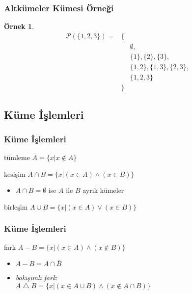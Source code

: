 \documentclass[dvipsnames]{beamer}
\theoremstyle{definition}
\theoremstyle{example}
\newtheorem{ornek}[theorem]{Örnek}
\theoremstyle{plain}
\begin{document}
\begin{frame}
  \frametitle{Altkümeler Kümesi Örneği}

  \begin{ornek}
    \begin{eqnarray*}
      \mathcal{P}(\{1,2,3\}) = & \{ &\\
                               &    & \emptyset,\\
                               &    & \{1\},\{2\},\{3\},\\
                               &    & \{1,2\},\{1,3\},\{2,3\},\\
                               &    & \{1,2,3\}\\
                               & \} &
    \end{eqnarray*}
  \end{ornek}
\end{frame}

\subsection{Küme İşlemleri}

\begin{frame}
  \frametitle{Küme İşlemleri}

  \begin{block}{tümleme}
    $\overline{A} = \{ x | x \notin A \} $
  \end{block}

  \pause
  \begin{block}{kesişim}
    $A \cap B = \{ x | (x \in A) \wedge (x \in B) \}$

    \begin{itemize}
      \item $A \cap B = \emptyset$ ise $A$ ile $B$ \alert{ayrık kümeler}
    \end{itemize}
  \end{block}

  \pause
  \begin{block}{birleşim}
    $A \cup B = \{ x | (x \in A) \vee (x \in B) \}$
  \end{block}
\end{frame}

\begin{frame}
  \frametitle{Küme İşlemleri}

  \begin{block}{fark}
    $A - B = \{ x | (x \in A) \wedge (x \notin B) \}$

    \pause
    \begin{itemize}
      \item $A-B = A \cap \overline{B}$

      \pause
      \item \emph{bakışımlı fark}:\\
        $A \bigtriangleup B = \{ x | (x \in A \cup B)
                              \wedge (x \notin A \cap B) \}$
    \end{itemize}
  \end{block}
\end{frame}
\end{document}
